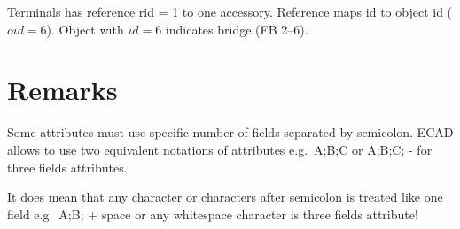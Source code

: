 \documentclass[%
	a4paper,
	oneside,
	listof=numbered,
	parskip=half,
	headsepline=true,
	footsepline=false,
	normalheadings,
	0.7headlines,
	headexclude,
	]{scrbook}
\begin{document}
Terminals has reference rid = 1 to one accessory.
Reference maps id to object id ($oid=6$).
Object with $id=6$ indicates bridge (FB 2--6).

\chapter{Remarks}

Some attributes must use specific number of fields separated by semicolon. 
ECAD allows to use two equivalent notations of attributes e.g.\ A;B;C or A;B;C; - for three fields attributes.

It does mean that any character or characters after semicolon is treated like one field e.g.\ A;B; + \glqq{}space or any whitespace character\grqq{} is three fields attribute!

\listoffigures
\lstlistoflistings

%
%
\end{document}
